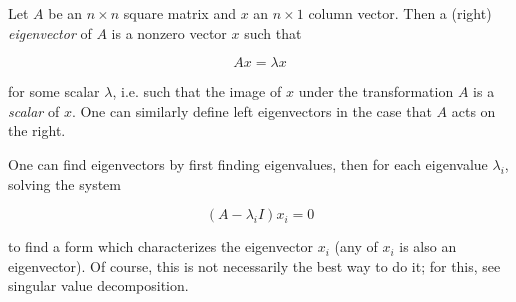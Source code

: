 \documentclass{article}
\begin{document}
Let $A$ be an $n \times n$ square matrix and $x$ an $n\times 1$ column vector. Then a (right) \emph{eigenvector} of $A$ is a nonzero vector $x$ such that

$$ Ax = \lambda x $$

for some scalar $\lambda$, i.e. such that the image of $x$ under the transformation $A$ is a \emph{scalar } of $x$.  One can similarly define left eigenvectors in the case that $A$ acts on the right.

One can find eigenvectors by first finding eigenvalues, then for each eigenvalue $\lambda_i$, solving the system

$$ (A-\lambda_i I) x_i = 0 $$

to find a form which characterizes the eigenvector $x_i$ (any  of $x_i$ is also an eigenvector).  Of course, this is not necessarily the best way to do it; for this, see  singular value decomposition.
\end{document}
